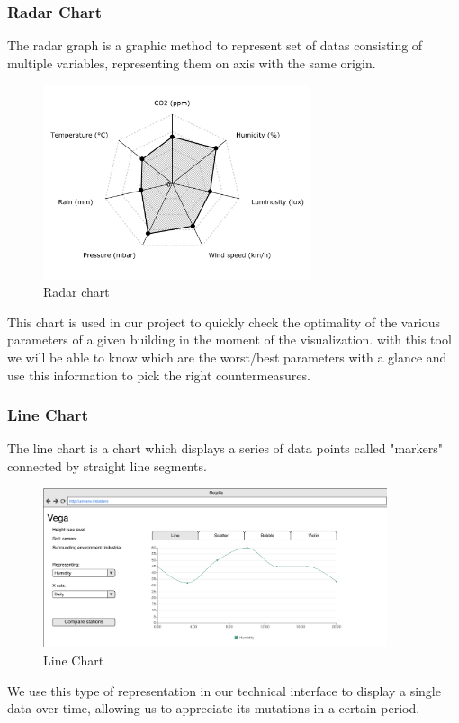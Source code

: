 \documentclass[12pt]{article} %
\begin{document}
\subsubsection{Radar Chart}
The radar graph is a graphic method to represent set of datas consisting of multiple variables, representing them on axis with the same origin.
\begin{figure}[H]
  \centering
  \includegraphics[width=0.7\textwidth]{img/radarChart.png}
  \caption{Radar chart}
  \label{fig:rdrChart}
\end{figure}
This chart is used in our project to quickly check the optimality of the various parameters of a given building in the moment of the visualization.
with this tool we will be able to know which are the worst/best parameters with a glance and use this information to pick the right countermeasures.

\subsubsection{Line Chart}
The line chart is a chart which displays a series of data points called "markers" connected by straight line segments.
\begin{figure}[H]
  \centering
  \includegraphics[width=0.9\textwidth]{img/lineChart.png}
  \caption{Line Chart}
  \label{fig:lnChart}
\end{figure}
We use this type of representation in our technical interface to display a single data over time, allowing us to appreciate its mutations in a certain period.
\end{document}
